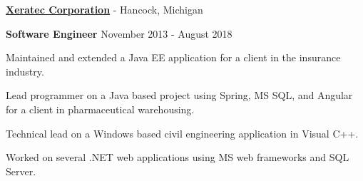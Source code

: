 {\href{http://www.xeratec.com/}{\textbf{Xeratec Corporation}} - Hancock, Michigan
\begin{outerlist}
\item[] \textbf{Software Engineer} \hfill  November 2013 - August 2018
 \begin{innerlist}
  \item Maintained and extended a Java EE application for a client in the insurance industry.
  \item Lead programmer on a Java based project using Spring, MS SQL, and Angular for a client in pharmaceutical warehousing.
  \item Technical lead on a Windows based civil engineering application in Visual C++.  
  \item Worked on several .NET web applications using MS web frameworks and SQL Server.
 \end{innerlist}
\end{outerlist}
\blankline
}

